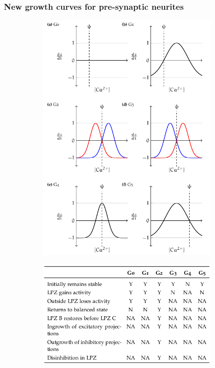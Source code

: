 \begin{frame}[c]
  \frametitle{New growth curves for pre-synaptic neurites}
  \begin{figure}[h]
  \begin{subfigure}[h]{0.4\textwidth}
    \includegraphics[width=\textwidth]{99_images/possible-growth-pre}
  \end{subfigure}
  \begin{subfigure}[c]{0.5\textwidth}
    \includegraphics[width=\textwidth]{99_images/growth-pre-table.png}
  \end{subfigure}
  \end{figure}
\end{frame}
